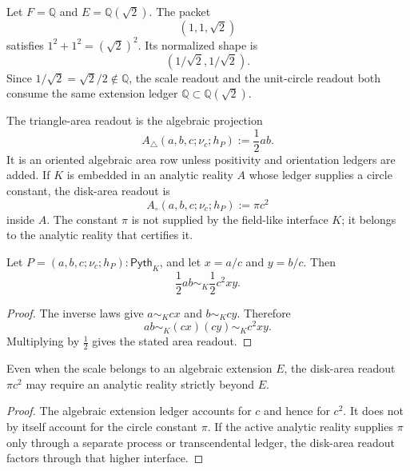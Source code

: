 \begin{example}
\label{ex:unified-reality-pythagorean-sqrt-two}
Let $F=\mathbb Q$ and $E=\mathbb Q(\sqrt{2})$. The packet
$$
(1,1,\sqrt{2})
$$
satisfies $1^2+1^2=(\sqrt{2})^2$. Its normalized shape is
$$
\left(1/\sqrt{2},1/\sqrt{2}\right).
$$
Since $1/\sqrt{2}=\sqrt{2}/2\notin\mathbb Q$, the scale readout and the
unit-circle readout both consume the same extension ledger
$\mathbb Q\subset\mathbb Q(\sqrt{2})$.
\end{example}

\begin{definition}
\label{def:unified-reality-pythagorean-measure-readouts}
The triangle-area readout is the algebraic projection
$$
A_{\triangle}(a,b,c;\nu_c;h_P):=\frac{1}{2}ab.
$$
It is an oriented algebraic area row unless positivity and orientation
ledgers are added. If $K$ is embedded in an analytic reality $A$ whose
ledger supplies a circle constant, the disk-area readout is
$$
A_{\circ}(a,b,c;\nu_c;h_P):=\pi c^2
$$
inside $A$. The constant $\pi$ is not supplied by the field-like
interface $K$; it belongs to the analytic reality that certifies it.
\end{definition}

\begin{theorem}
\label{thm:unified-reality-pythagorean-area-shape-scale}
Let $P=(a,b,c;\nu_c;h_P):\mathsf{Pyth}_K$, and let
$x=a/c$ and $y=b/c$. Then
$$
\frac{1}{2}ab\sim_K\frac{1}{2}c^2xy.
$$
\end{theorem}

\begin{proof}
The inverse laws give $a\sim_Kcx$ and $b\sim_Kcy$. Therefore
$$
ab\sim_K(cx)(cy)\sim_Kc^2xy.
$$
Multiplying by $\frac{1}{2}$ gives the stated area readout.
\end{proof}

\begin{corollary}
\label{cor:unified-reality-pythagorean-measure-analytic-layer}
Even when the scale belongs to an algebraic extension $E$, the disk-area
readout $\pi c^2$ may require an analytic reality strictly beyond $E$.
\end{corollary}

\begin{proof}
The algebraic extension ledger accounts for $c$ and hence for $c^2$.
It does not by itself account for the circle constant $\pi$. If the
active analytic reality supplies $\pi$ only through a separate process
or transcendental ledger, the disk-area readout factors through that
higher interface.
\end{proof}

